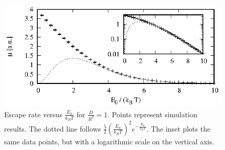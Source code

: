 \documentclass{article}
\begin{document}
\begin{figure}
  \centering
  \includegraphics[width=\linewidth]{mu_vs_E0.eps}
  \caption{\label{mu_vs_E0}Escape rate versus $\frac{E_0}{k_BT}$ for
           $\frac{D}{R^2} = 1$. Points represent simulation results. The dotted
           line follows $\frac{5}{2}\left(\frac{E_0}{k_BT}\right)^2
           e^{-\frac{E_0}{k_BT}}$. The inset plots the same data points, but
           with a logarithmic scale on the vertical axis.}
\end{figure}
\end{document}
